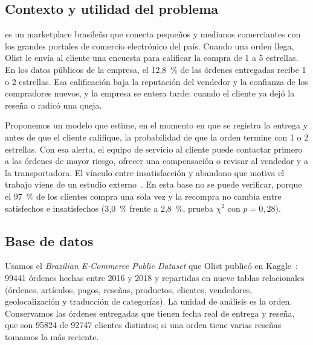 \documentclass[journal]{IEEEtran}
\begin{document}
\subsection{Contexto y utilidad del problema}

 es un marketplace brasileño que conecta pequeños y medianos comerciantes con los grandes portales de comercio electrónico del país. Cuando una orden llega, Olist le envía al cliente una encuesta para calificar la compra de 1 a 5 estrellas. En los datos públicos de la empresa, el 12,8~\% de las órdenes entregadas recibe 1 o 2 estrellas. Esa calificación baja la reputación del vendedor y la confianza de los compradores nuevos, y la empresa se entera tarde: cuando el cliente ya dejó la reseña o radicó una queja.

Proponemos un modelo que estime, en el momento en que se registra la entrega y antes de que el cliente califique, la probabilidad de que la orden termine con 1 o 2 estrellas. Con esa alerta, el equipo de servicio al cliente puede contactar primero a las órdenes de mayor riesgo, ofrecer una compensación o revisar al vendedor y a la transportadora. El vínculo entre insatisfacción y abandono que motiva el trabajo viene de un estudio externo~\cite{zeinali2026}. En esta base no se puede verificar, porque el 97~\% de los clientes compra una sola vez y la recompra no cambia entre satisfechos e insatisfechos (3,0~\% frente a 2,8~\%, prueba $\chi^2$ con $p=0{,}28$).

\subsection{Base de datos}
\label{sec:datos}

Usamos el \emph{Brazilian E-Commerce Public Dataset} que Olist publicó en Kaggle~\cite{olist2018}: \num{99441} órdenes hechas entre 2016 y 2018 y repartidas en nueve tablas relacionales (órdenes, artículos, pagos, reseñas, productos, clientes, vendedores, geolocalización y traducción de categorías). La unidad de análisis es la orden. Conservamos las órdenes entregadas que tienen fecha real de entrega y reseña, que son \num{95824} de \num{92747} clientes distintos; si una orden tiene varias reseñas tomamos la más reciente.
\end{document}
